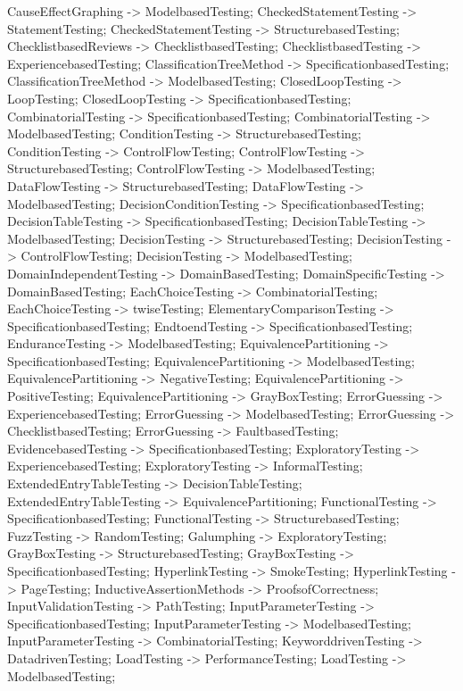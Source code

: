 \documentclass{article}
\begin{document}
{CauseEffectGraphing -> ModelbasedTesting;
CheckedStatementTesting -> StatementTesting;
CheckedStatementTesting -> StructurebasedTesting;
ChecklistbasedReviews -> ChecklistbasedTesting;
ChecklistbasedTesting -> ExperiencebasedTesting;
ClassificationTreeMethod -> SpecificationbasedTesting;
ClassificationTreeMethod -> ModelbasedTesting;
ClosedLoopTesting -> LoopTesting;
ClosedLoopTesting -> SpecificationbasedTesting;
CombinatorialTesting -> SpecificationbasedTesting;
CombinatorialTesting -> ModelbasedTesting;
ConditionTesting -> StructurebasedTesting;
ConditionTesting -> ControlFlowTesting;
ControlFlowTesting -> StructurebasedTesting;
ControlFlowTesting -> ModelbasedTesting;
DataFlowTesting -> StructurebasedTesting;
DataFlowTesting -> ModelbasedTesting;
DecisionConditionTesting -> SpecificationbasedTesting;
DecisionTableTesting -> SpecificationbasedTesting;
DecisionTableTesting -> ModelbasedTesting;
DecisionTesting -> StructurebasedTesting;
DecisionTesting -> ControlFlowTesting;
DecisionTesting -> ModelbasedTesting;
DomainIndependentTesting -> DomainBasedTesting;
DomainSpecificTesting -> DomainBasedTesting;
EachChoiceTesting -> CombinatorialTesting;
EachChoiceTesting -> twiseTesting;
ElementaryComparisonTesting -> SpecificationbasedTesting;
EndtoendTesting -> SpecificationbasedTesting;
EnduranceTesting -> ModelbasedTesting;
EquivalencePartitioning -> SpecificationbasedTesting;
EquivalencePartitioning -> ModelbasedTesting;
EquivalencePartitioning -> NegativeTesting;
EquivalencePartitioning -> PositiveTesting;
EquivalencePartitioning -> GrayBoxTesting;
ErrorGuessing -> ExperiencebasedTesting;
ErrorGuessing -> ModelbasedTesting;
ErrorGuessing -> ChecklistbasedTesting;
ErrorGuessing -> FaultbasedTesting;
EvidencebasedTesting -> SpecificationbasedTesting;
ExploratoryTesting -> ExperiencebasedTesting;
ExploratoryTesting -> InformalTesting;
ExtendedEntryTableTesting -> DecisionTableTesting;
ExtendedEntryTableTesting -> EquivalencePartitioning;
FunctionalTesting -> SpecificationbasedTesting;
FunctionalTesting -> StructurebasedTesting;
FuzzTesting -> RandomTesting;
Galumphing -> ExploratoryTesting;
GrayBoxTesting -> StructurebasedTesting;
GrayBoxTesting -> SpecificationbasedTesting;
HyperlinkTesting -> SmokeTesting;
HyperlinkTesting -> PageTesting;
InductiveAssertionMethods -> ProofsofCorrectness;
InputValidationTesting -> PathTesting;
InputParameterTesting -> SpecificationbasedTesting;
InputParameterTesting -> ModelbasedTesting;
InputParameterTesting -> CombinatorialTesting;
KeyworddrivenTesting -> DatadrivenTesting;
LoadTesting -> PerformanceTesting;
LoadTesting -> ModelbasedTesting;
}
\end{document}
